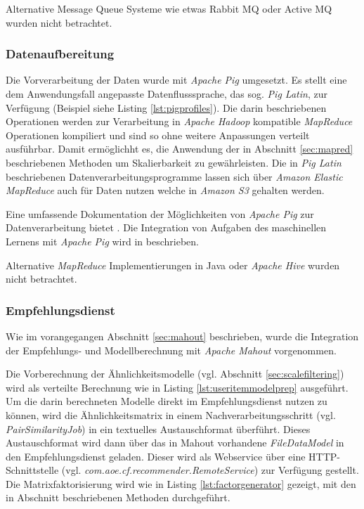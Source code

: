 Alternative Message Queue Systeme wie etwas Rabbit MQ oder Active MQ wurden nicht betrachtet. 

\subsubsection{Datenaufbereitung} Die Vorverarbeitung der Daten wurde mit \textit{Apache Pig} umgesetzt. Es stellt eine dem Anwendungsfall angepasste Datenflusssprache, das sog. \textit{Pig Latin}, zur Verfügung (Beispiel siehe Listing \ref{lst:pigprofiles}). Die darin beschriebenen Operationen werden zur Verarbeitung in \textit{Apache Hadoop} kompatible \textit{MapReduce} Operationen kompiliert und sind so ohne weitere Anpassungen verteilt ausführbar.  Damit ermöglichht es, die Anwendung der in Abschnitt \ref{sec:mapred} beschriebenen Methoden um Skalierbarkeit zu gewährleisten. Die in \textit{Pig Latin} beschriebenen Datenverarbeitungsprogramme lassen sich über \textit{Amazon Elastic MapReduce} auch für Daten nutzen welche in \textit{Amazon S3} gehalten werden. \citep{Lin2012}

 

Eine umfassende Dokumentation der Möglichkeiten von \textit{Apache Pig} zur Datenverarbeitung bietet \citep{gates2011programming}. Die Integration von Aufgaben des maschinellen Lernens mit  \textit{Apache Pig} wird in  \citep{Lin2012} beschrieben.

Alternative \textit{MapReduce} Implementierungen in Java oder \textit{Apache Hive} wurden nicht betrachtet.

\subsubsection{Empfehlungsdienst} Wie im vorangegangen Abschnitt \ref{sec:mahout} beschrieben, wurde die Integration der Empfehlungs- und Modellberechnung mit \textit{Apache Mahout} vorgenommen. 

Die Vorberechnung der Ähnlichkeitsmodelle (vgl. Abschnitt \ref{sec:scalefiltering}) wird als verteilte Berechnung wie in Listing \ref{lst:useritemmodelprep} ausgeführt. Um die darin berechneten Modelle direkt im Empfehlungsdienst nutzen zu können, wird die Ähnlichkeitsmatrix in einem Nachverarbeitungsschritt (vgl. \textit{PairSimilarityJob}) in ein textuelles Austauschformat überführt. Dieses Austauschformat wird dann über das in Mahout vorhandene \textit{FileDataModel} in den Empfehlungsdienst geladen. Dieser wird als Webservice über eine HTTP-Schnittstelle (vgl. \textit{com.aoe.cf.recommender.RemoteService}) zur Verfügung gestellt. Die Matrixfaktorisierung wird wie in Listing \ref{lst:factorgenerator} gezeigt, mit den in Abschnitt \label{sec:myrecommend} beschriebenen Methoden durchgeführt.

